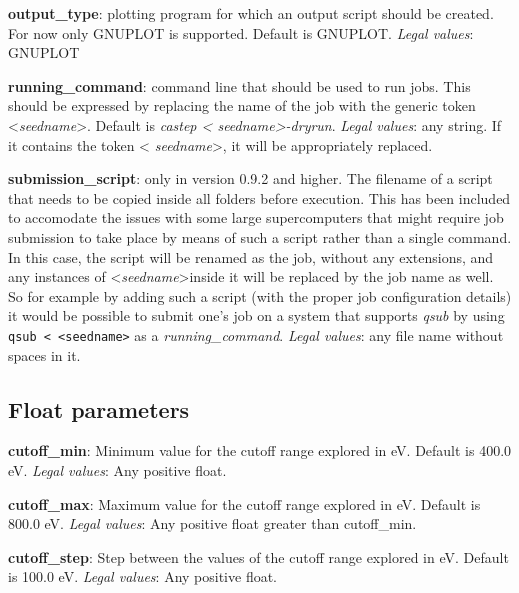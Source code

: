 \documentclass[10pt]{article}
\begin{document}
\textbf{output\_type}: plotting program for which an output script should be 
created. For now only GNUPLOT is supported. Default is GNUPLOT.\newline
\textit{Legal values}: GNUPLOT\newline

\textbf{running\_command}: command line that should be used to run jobs. This 
should be expressed by replacing the name of the job with the generic token 
\textless \textit{seedname}\textgreater. Default is \textit{castep \textless 
seedname\textgreater -dryrun}.\newline
\textit{Legal values}: any string. If it contains the token \textless 
\textit{seedname}\textgreater, it will be appropriately replaced.\newline

\textbf{submission\_script}: only in version 0.9.2 and higher. The filename of a 
script that needs to be copied inside all folders before execution. This has 
been included to accomodate the issues with some large supercomputers that might 
require job submission to take place by means of such a script rather than a 
single command. In this case, the script will be renamed as the job, without any 
extensions, and any instances of \textless \textit{seedname}\textgreater inside 
it will be replaced by the job name as well. So for example by adding such a 
script (with the proper job configuration details) it would be possible to 
submit one's job on a system that supports \textit{qsub} by using \texttt{qsub 
\textless~\textless seedname\textgreater} as a 
\textit{running\_command}.\newline
\textit{Legal values}: any file name without spaces in it.

\subsection{Float parameters}

\textbf{cutoff\_min}: Minimum value for the cutoff range explored in eV. Default 
is 400.0 eV.\newline
\textit{Legal values}: Any positive float.\newline

\textbf{cutoff\_max}: Maximum value for the cutoff range explored in eV. Default 
is 800.0 eV.\newline
\textit{Legal values}: Any positive float greater than cutoff\_min.\newline

\textbf{cutoff\_step}: Step between the values of the cutoff range explored in 
eV. Default is 100.0 eV.\newline
\textit{Legal values}: Any positive float.\newline
\end{document}
